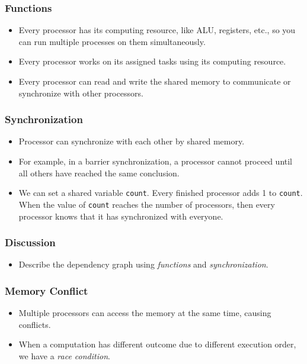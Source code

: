 \documentclass{beamer}
\begin{document}
\begin{CJK}{UTF8}{bsmi}
\begin{frame}
\frametitle{Functions} 
\begin{itemize}
\item Every processor has its computing resource, like ALU, registers, etc., so you can run multiple processes on them simultaneously.
\item Every processor works on its assigned tasks using its computing resource.
\item Every processor can read and write the shared memory to communicate or synchronize with other processors.
\end{itemize}
\end{frame}

\begin{frame}
\frametitle{Synchronization}
\begin{itemize}
\item Processor can synchronize with each other by shared memory.
\item For example, in a barrier synchronization, a processor cannot proceed until all others have reached the same conclusion.
\item We can set a shared variable {\tt count}. 
Every finished processor adds 1 to {\tt count}. 
When the value of {\tt count} reaches the number of processors, then every processor knows that it has synchronized with everyone.
\end{itemize}
\end{frame}

\begin{frame}
\frametitle{Discussion}
\begin{itemize}
\item Describe the dependency graph using {\em functions} and {\em
  synchronization}.
\end{itemize}
\end{frame}

\begin{frame}
\frametitle{Memory Conflict}
\begin{itemize}
\item Multiple processors can access the memory at the same time,
  causing conflicts.
\item When a computation has different outcome due to different
  execution order, we have a {\em race condition}.
\end{itemize}
\end{frame}


\end{CJK}
\end{document}
